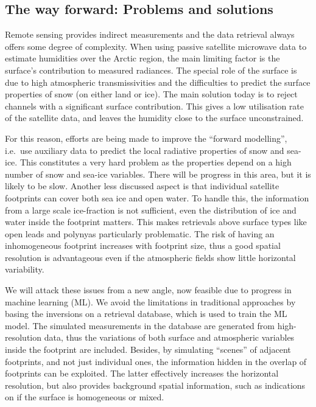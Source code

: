 \documentclass[12pt,oneside,a4paper]{article}
\begin{document}
\subsection{The way forward: Problems and solutions }

Remote sensing provides indirect measurements and the data retrieval always
offers some degree of complexity. When using passive satellite microwave data
to estimate humidities over the Arctic region, the main limiting factor is the
surface's contribution to measured radiances. The special role of the surface
is due to high atmospheric transmissivities and the difficulties to predict the
surface properties of snow (on either land or ice). The main solution today is
to reject channels with a significant surface contribution. This gives a low
utilisation rate of the satellite data, and leaves the humidity close to the
surface unconstrained.

For this reason, efforts are being made to improve the ``forward modelling'',
i.e.\ use auxiliary data to predict the local radiative properties of snow and
sea-ice. This constitutes a very hard problem as the properties depend on a
high number of snow and sea-ice variables. There will be progress in this area,
but it is likely to be slow. Another less discussed aspect is that individual
satellite footprints can cover both sea ice and open water. To handle this, the
information from a large scale ice-fraction is not sufficient, even the
distribution of ice and water inside the footprint matters. This makes
retrievals above surface types like open leads and polynyas particularly
problematic. The risk of having an inhomogeneous footprint increases with
footprint size, thus a good spatial resolution is advantageous even if the
atmospheric fields show little horizontal variability.

We will attack these issues from a new angle, now feasible due to progress in
machine learning (ML). We avoid the limitations in traditional approaches by
basing the inversions on a retrieval database, which is used to train the ML
model. The simulated measurements in the database are generated from
high-resolution data, thus the variations of both surface and atmospheric variables
inside the footprint are included. Besides, by simulating ``scenes'' of
adjacent footprints, and not just individual ones, the information hidden in
the overlap of footprints can be exploited. The latter effectively increases the
horizontal resolution, but also provides background spatial information, such
as indications on if the surface is homogeneous or mixed.
\end{document}
